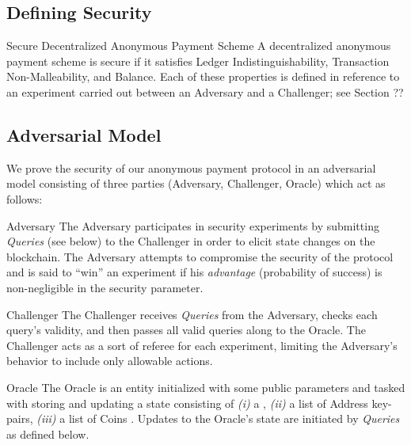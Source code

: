 

\subsection{Defining Security}


{\color{blue}
\begin{definitiontoc}{Secure Decentralized Anonymous Payment Scheme}
    A decentralized anonymous payment scheme is secure if it satisfies Ledger Indistinguishability, Transaction Non-Malleability, and Balance. Each of these properties is defined in reference to an experiment carried out between an Adversary and a Challenger; see Section ?? 
\end{definitiontoc}
}

\subsection{Adversarial Model}

We prove the security of our anonymous payment protocol in an adversarial model consisting of three parties (Adversary, Challenger, Oracle) which act as follows:


\begin{definitiontoc}{Adversary}
    The Adversary participates in security experiments by submitting \emph{Queries} (see below) to the Challenger in order to elicit state changes on the blockchain.  The Adversary attempts to compromise the security of the protocol and is said to ``win'' an experiment if his \emph{advantage} (probability of success) is non-negligible in the security parameter.
\end{definitiontoc}

\begin{definitiontoc}{Challenger}
    The Challenger receives \emph{Queries} from the Adversary, checks each query's validity, and then passes all valid queries along to the Oracle.  The Challenger acts as a sort of referee for each experiment, limiting the Adversary's behavior to include only allowable actions.
\end{definitiontoc}

\begin{definitiontoc}{Oracle}
    The Oracle is an entity initialized with some public parameters and tasked with storing and updating a state consisting of \emph{(i)} a \Ledger, \emph{(ii)} a list of Address key-pairs, {\color{blue} \emph{(iii)} a list of Coins }.  Updates to the Oracle's state are initiated by \emph{Queries} as defined below.
\end{definitiontoc}

